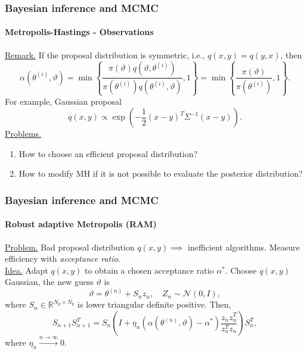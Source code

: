 \documentclass{beamer}
\newcommand{\R}{\mathbb{R}}
\begin{document}
\begin{frame}
	\frametitle{Bayesian inference and MCMC}
	\framesubtitle{Metropolis-Hastings - Observations}
	
	\underline{Remark.} If the proposal distribution is symmetric, i.e., $q(x,y) = q(y,x)$, then 
	\begin{equation*}
		\alpha(\theta^{(i)}, \vartheta) = \min\left\{\frac{\pi(\vartheta)q(\vartheta, \theta^{(i)})}{\pi(\theta^{(i)})q(\theta^{(i)}, \vartheta)}, 1\right\} = \min\left\{\frac{\pi(\vartheta)}{\pi(\theta^{(i)})}, 1\right\}.
	\end{equation*}
	For example, Gaussian proposal \cite{KaS05}
	\begin{equation*}
		q(x, y) \propto \exp(-\frac{1}{2}(x - y)^T\Sigma^{-1}(x - y)).
	\end{equation*}
	\underline{Problems.} 
	\begin{enumerate}
		\item How to choose an efficient proposal distribution?
		\item How to modify MH if it is not possible to evaluate the posterior distribution?
	\end{enumerate}
\end{frame}

\begin{frame}
	\frametitle{Bayesian inference and MCMC}
	\framesubtitle{Robust adaptive Metropolis (RAM) \cite{Vih12}}
	
	\underline{Problem.} Bad proposal distribution $q(x,y) \implies$ inefficient algorithms. Measure efficiency with \textit{acceptance ratio}. \\[0.5cm]
	\underline{Idea.} Adapt $q(x,y)$ to obtain a chosen acceptance ratio $\alpha^*$. Choose $q(x,y)$ Gaussian, the new guess $\vartheta$ is 
	\begin{equation*}
		\vartheta = \theta^{(n)} + S_n z_n, \quad Z_n \sim \mathcal{N}(0, I),
	\end{equation*}
	where $S_n \in \R^{N_p\times N_p}$ is lower triangular definite positive. Then, 
	\begin{equation*}
		S_{n+1}S_{n+1}^T = S_n\left(I + \eta_n\left(\alpha(\theta^{(n)}, \vartheta) - \alpha^*\right)\frac{z_nz_n^T}{z_n^Tz_n}\right)S_n^T,
	\end{equation*}
	where $\eta_n \xrightarrow{n\to\infty} 0$.
	
\end{frame}
\end{document}
